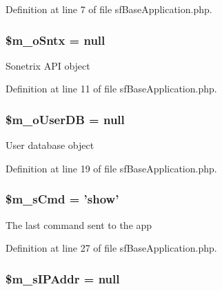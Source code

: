 Definition at line 7 of file sfBaseApplication.php.

\hypertarget{classSFApplication_a22d1091f94c58e3533304abe3eb9e9fe}{
\subsubsection[{\$m\_\-oSntx}]{\setlength{\rightskip}{0pt plus 5cm}\$m\_\-oSntx = null}}
\label{classSFApplication_a22d1091f94c58e3533304abe3eb9e9fe}
Sonetrix API object 

Definition at line 11 of file sfBaseApplication.php.

\hypertarget{classSFApplication_a480a834e33015cc9a001d1d84972bb12}{
\subsubsection[{\$m\_\-oUserDB}]{\setlength{\rightskip}{0pt plus 5cm}\$m\_\-oUserDB = null}}
\label{classSFApplication_a480a834e33015cc9a001d1d84972bb12}
User database object 

Definition at line 19 of file sfBaseApplication.php.

\hypertarget{classSFApplication_a21ffd6ebc459ccba9514cbaee05b2ece}{
\subsubsection[{\$m\_\-sCmd}]{\setlength{\rightskip}{0pt plus 5cm}\$m\_\-sCmd = 'show'}}
\label{classSFApplication_a21ffd6ebc459ccba9514cbaee05b2ece}
The last command sent to the app 

Definition at line 27 of file sfBaseApplication.php.

\hypertarget{classSFApplication_a2db945fecc9d0f95e19093d7829be78d}{
\subsubsection[{\$m\_\-sIPAddr}]{\setlength{\rightskip}{0pt plus 5cm}\$m\_\-sIPAddr = null}}
\label{classSFApplication_a2db945fecc9d0f95e19093d7829be78d}


